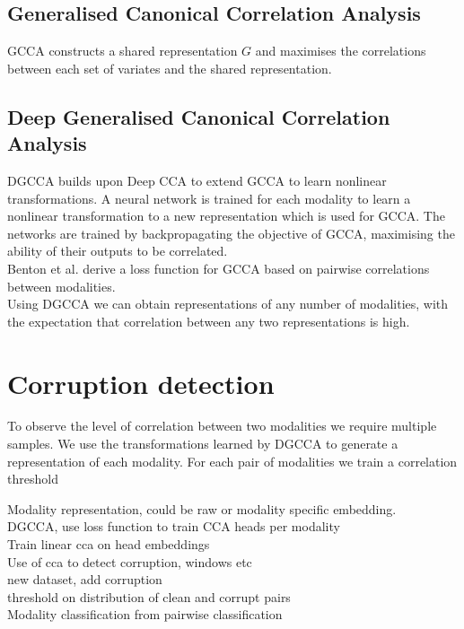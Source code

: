 \subsection{Generalised Canonical Correlation Analysis}
GCCA \cite{GCCA} constructs a shared representation $G$ and maximises the correlations between each set of variates and  the shared representation.

\subsection{Deep Generalised Canonical Correlation Analysis}
DGCCA builds upon Deep CCA \cite{DCCA} to extend GCCA to learn nonlinear transformations. A neural network is trained for each modality to learn a nonlinear transformation to a new representation which is used for GCCA. The networks are trained by backpropagating the objective of GCCA, maximising the ability of their outputs to be correlated.\\

Benton et al. \cite{DGCCA} derive a loss function for GCCA based on pairwise correlations between modalities.\\

Using DGCCA we can obtain representations of any number of modalities, with the expectation that correlation between any two representations is high.

\section{Corruption detection}
To observe the level of correlation between two modalities we require multiple samples. We use the transformations learned by DGCCA to generate a representation of each modality. For each pair of modalities we train a correlation threshold

Modality representation, could be raw or modality specific embedding.\\

DGCCA, use loss function to train CCA heads per modality\\

Train linear cca on head embeddings\\

Use of cca to detect corruption, windows etc\\

new dataset, add corruption\\

threshold on distribution of clean and corrupt pairs\\

Modality classification from pairwise classification\\
